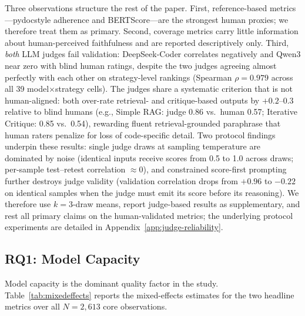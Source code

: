 \documentclass[pdflatex,sn-mathphys-ay]{sn-jnl}%
\theoremstyle{thmstyleone}%
\theoremstyle{thmstyletwo}%
\theoremstyle{thmstylethree}%
\begin{document}
Three observations structure the rest of the paper. First, reference-based metrics---pydocstyle adherence and BERTScore---are the strongest human proxies; we therefore treat them as primary. Second, coverage metrics carry little information about human-perceived faithfulness and are reported descriptively only. Third, \emph{both} LLM judges fail validation: DeepSeek-Coder correlates negatively and Qwen3 near zero with blind human ratings, despite the two judges agreeing almost perfectly with each other on strategy-level rankings (Spearman $\rho = 0.979$ across all 39 model$\times$strategy cells). The judges share a systematic criterion that is not human-aligned: both over-rate retrieval- and critique-based outputs by $+0.2$--$0.3$ relative to blind humans (e.g., Simple RAG: judge 0.86 vs.\ human 0.57; Iterative Critique: 0.85 vs.\ 0.54), rewarding fluent retrieval-grounded paraphrase that human raters penalize for loss of code-specific detail. Two protocol findings underpin these results: single judge draws at sampling temperature are dominated by noise (identical inputs receive scores from 0.5 to 1.0 across draws; per-sample test--retest correlation $\approx 0$), and constrained score-first prompting further destroys judge validity (validation correlation drops from $+0.96$ to $-0.22$ on identical samples when the judge must emit its score before its reasoning). We therefore use $k{=}3$-draw means, report judge-based results as supplementary, and rest all primary claims on the human-validated metrics; the underlying protocol experiments are detailed in Appendix~\ref{app:judge-reliability}.

\subsection{RQ1: Model Capacity}
\label{sec:rq1}
Model capacity is the dominant quality factor in the study. Table~\ref{tab:mixedeffects} reports the mixed-effects estimates for the two headline metrics over all $N{=}2{,}613$ core observations.
\end{document}
